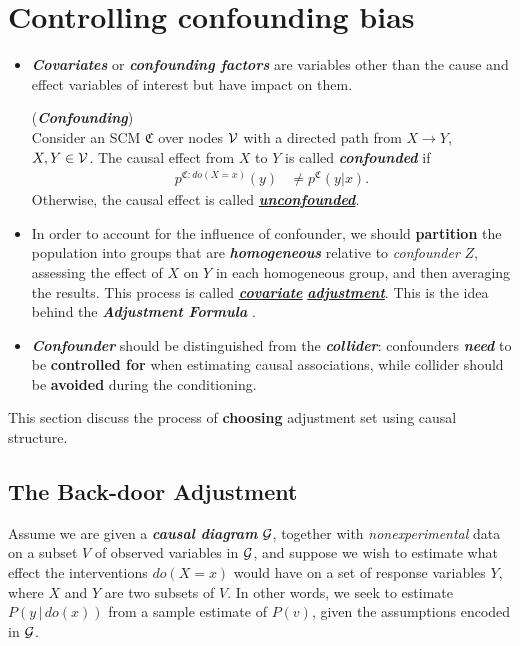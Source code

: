 \documentclass[11pt]{article}
\begin{document}
\section{Controlling confounding bias}
\begin{itemize}
\item \emph{\textbf{Covariates}} or \emph{\textbf{confounding factors}} are variables other than the cause and effect variables of interest but have impact on them.
\begin{definition} (\textbf{\emph{Confounding}}) \citep{peters2017elements} \\
Consider an SCM  $\mathfrak{C}$ over nodes ${\mathcal V}$ with a directed path from $X \rightarrow Y$, $X, Y \in {\mathcal V}$. The causal effect from $X$ to $Y$ is called \emph{\textbf{confounded}} if
\begin{align}
p^{\mathfrak{C}: do(X=x)}(y) &\neq p^{\mathfrak{C}}(y | x). \label{eqn: confounding}
\end{align}
Otherwise, the causal effect is called \underline{\textbf{\emph{unconfounded}}}.
\end{definition}

\item In order to account for the influence of confounder, we should \textbf{partition} the population into groups that are \emph{\textbf{homogeneous}} relative to \emph{confounder} $Z$, assessing the effect of $X$ on $Y$ in each homogeneous group, and then averaging the results. This process is called \underline{\textbf{\emph{covariate}}} \underline{\textbf{\emph{adjustment}}}. This is the idea behind the \emph{\textbf{Adjustment Formula}}  \citep{imbens2015causal}.

\item \emph{\textbf{Confounder}} should be distinguished from the \emph{\textbf{collider}}: confounders \emph{\textbf{need}} to be \textbf{controlled for} when estimating causal associations, while collider should be \textbf{avoided} during the conditioning.
\end{itemize}



This section discuss the process of \textbf{choosing} adjustment set using causal structure.
\subsection{The Back-door Adjustment}
Assume we are given a \emph{\textbf{causal diagram}} ${\mathcal G}$, together with \emph{nonexperimental} data on a subset $V$ of observed variables in ${\mathcal G}$, and suppose we wish to estimate what effect the interventions $do(X = x)$ would have on a set of response variables $Y$, where $X$ and $Y$ are two subsets of $V$. In other words, we seek to estimate $P(y\,|\, do(x))$ from a sample estimate of $P(v)$, given the assumptions encoded in ${\mathcal G}$.
\end{document}
